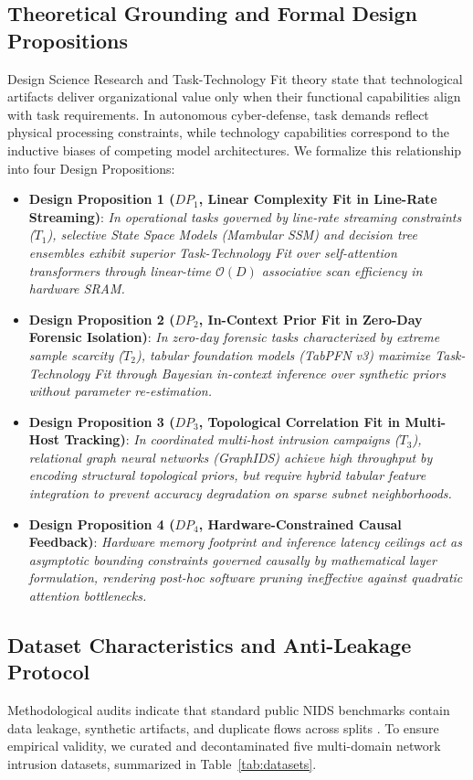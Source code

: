 \documentclass[10pt,a4paper]{article}
\begin{document}
\subsection{Theoretical Grounding and Formal Design Propositions}
Design Science Research \cite{hevner2004design} and Task-Technology Fit theory \cite{goodhue1995task} state that technological artifacts deliver organizational value only when their functional capabilities align with task requirements. In autonomous cyber-defense, task demands reflect physical processing constraints, while technology capabilities correspond to the inductive biases of competing model architectures. We formalize this relationship into four Design Propositions:
\begin{itemize}
    \item \textbf{Design Proposition 1 ($DP_1$, Linear Complexity Fit in Line-Rate Streaming)}: \textit{In operational tasks governed by line-rate streaming constraints ($T_1$), selective State Space Models (Mambular SSM) and decision tree ensembles exhibit superior Task-Technology Fit over self-attention transformers through linear-time $\mathcal{O}(D)$ associative scan efficiency in hardware SRAM.}
    \item \textbf{Design Proposition 2 ($DP_2$, In-Context Prior Fit in Zero-Day Forensic Isolation)}: \textit{In zero-day forensic tasks characterized by extreme sample scarcity ($T_2$), tabular foundation models (TabPFN v3) maximize Task-Technology Fit through Bayesian in-context inference over synthetic priors without parameter re-estimation.}
    \item \textbf{Design Proposition 3 ($DP_3$, Topological Correlation Fit in Multi-Host Tracking)}: \textit{In coordinated multi-host intrusion campaigns ($T_3$), relational graph neural networks (GraphIDS) achieve high throughput by encoding structural topological priors, but require hybrid tabular feature integration to prevent accuracy degradation on sparse subnet neighborhoods.}
    \item \textbf{Design Proposition 4 ($DP_4$, Hardware-Constrained Causal Feedback)}: \textit{Hardware memory footprint and inference latency ceilings act as asymptotic bounding constraints governed causally by mathematical layer formulation, rendering post-hoc software pruning ineffective against quadratic attention bottlenecks.}
\end{itemize}

\subsection{Dataset Characteristics and Anti-Leakage Protocol}
Methodological audits indicate that standard public NIDS benchmarks contain data leakage, synthetic artifacts, and duplicate flows across splits \cite{engelen2021troubleshooting, lanvin2022errors}. To ensure empirical validity, we curated and decontaminated five multi-domain network intrusion datasets, summarized in Table~\ref{tab:datasets}.
\end{document}
